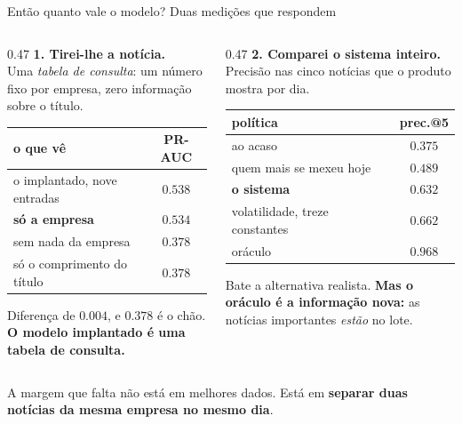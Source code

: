 \documentclass[aspectratio=169]{beamer}
\begin{document}
\begin{frame}{Então quanto vale o modelo? Duas medições que respondem}
\small
\begin{columns}[T]
\begin{column}{0.47\textwidth}
\textbf{1. Tirei-lhe a notícia.}\\[1mm]
{\scriptsize Uma \emph{tabela de consulta}: um número fixo por empresa, zero informação sobre o
título.}
\vspace{1mm}
\begin{center}\scriptsize
\begin{tabular}{lc}
\toprule
\textbf{o que vê} & \textbf{PR-AUC} \\
\midrule
o implantado, nove entradas & $0.538$ \\
\textbf{só a empresa} & $\mathbf{0.534}$ \\
sem nada da empresa & $0.378$ \\
só o comprimento do título & $0.378$ \\
\bottomrule
\end{tabular}
\end{center}
\vspace{1mm}
{\scriptsize Diferença de $0.004$, e $0.378$ é o chão. \textbf{O modelo implantado é uma tabela de
consulta.}}
\end{column}
\begin{column}{0.47\textwidth}
\textbf{2. Comparei o sistema inteiro.}\\[1mm]
{\scriptsize Precisão nas cinco notícias que o produto mostra por dia.}
\vspace{1mm}
\begin{center}\scriptsize
\begin{tabular}{lc}
\toprule
\textbf{política} & \textbf{prec.@5} \\
\midrule
ao acaso & $0.375$ \\
quem mais se mexeu hoje & $0.489$ \\
\textbf{o sistema} & $\mathbf{0.632}$ \\
volatilidade, treze constantes & $0.662$ \\
oráculo & $0.968$ \\
\bottomrule
\end{tabular}
\end{center}
\vspace{1mm}
{\scriptsize Bate a alternativa realista. \textbf{Mas o oráculo é a informação nova:} as notícias
importantes \emph{estão} no lote.}
\end{column}
\end{columns}
\vspace{2mm}
\begin{center}
A margem que falta não está em melhores dados. Está em \textbf{separar duas notícias da mesma
empresa no mesmo dia}.
\end{center}
\end{frame}
\end{document}
